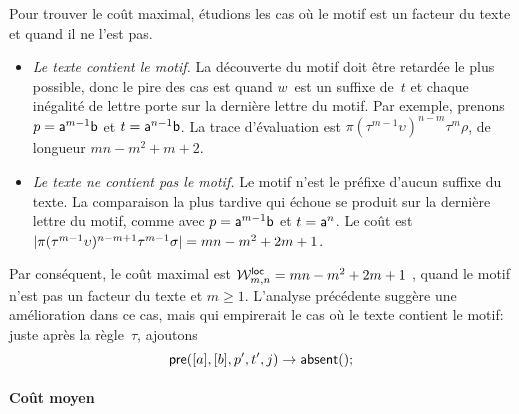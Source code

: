 Pour trouver le coût maximal, étudions les cas où le motif est un
facteur du texte et quand il ne l'est pas.
\begin{itemize}

\item \emph{Le texte contient le motif.} La découverte du motif doit
  être retardée le plus possible, donc le pire des cas est quand
  \(w\)~est un suffixe de~\(t\) et chaque inégalité de lettre porte
  sur la dernière lettre du motif. Par exemple, prenons \(p =
  \word{a}^{m-1}\word{b}\) et \(t = \word{a}^{n-1}\word{b}\). La trace
  d'évaluation est \(\pi (\tau^{m-1}\upsilon)^{n-m} \tau^m\rho\), de
  longueur \(mn-m^2+m+2\).

  \item \emph{Le texte ne contient pas le motif.} Le motif n'est le
  préfixe d'aucun suffixe du texte. La comparaison la plus tardive qui
  échoue se produit sur la dernière lettre du motif, comme avec \(p =
  \word{a}^{m-1}\word{b}\) et \(t = \word{a}^{n}\). Le coût est
  \(\len{\pi(\tau^{m-1}\upsilon)^{n-m+1}\tau^{m-1}\sigma} = mn - m^2 +
  2m + 1\).

\end{itemize}
Par conséquent, le coût maximal est \(\W{\fun{loc}}{m,n} = mn - m^2 +
2m + 1\) , quand le motif n'est pas un
facteur du texte et \(m \geqslant 1\). L'analyse précédente suggère
une amélioration dans ce cas, mais qui empirerait le cas où le texte
contient le motif: juste après la règle~\(\tau\), ajoutons
\begin{equation*}
\belowdisplayskip=0pt
\fun{pre}([a],[b],p',t',j) \rightarrow \fun{absent}();\index{pre@\fun{pre/5}}
\end{equation*}

\paragraph{Coût moyen}

